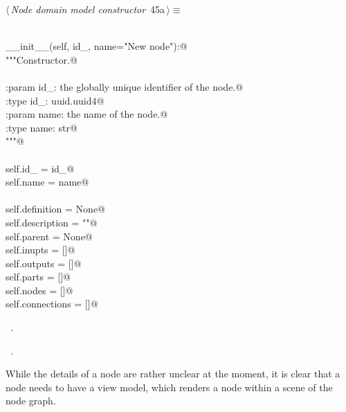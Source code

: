 \documentclass[
    a4paper,      %
    10pt,         %
    openright,    %
    notitlepage,  %
    parskip=half, %
]{scrreprt}       %
\theoremstyle{definition}                    %
\begin{document}
\begin{flushleft} \small
\begin{minipage}{\linewidth}\label{scrap58}\raggedright\small
{} $\langle\,${\itshape Node domain model constructor}\nobreak\ {\footnotesize {45a}}$\,\rangle\equiv$
\vspace{-1ex}
\begin{list}{}{} \item
\mbox{}\lstinline@@\\
\mbox{}\lstinline@def __init__(self, id_, name="New node"):@\\
\mbox{}\lstinline@    """Constructor.@\\
\mbox{}\lstinline@@\\
\mbox{}\lstinline@    :param id_: the globally unique identifier of the node.@\\
\mbox{}\lstinline@    :type  id_: uuid.uuid4@\\
\mbox{}\lstinline@    :param name: the name of the node.@\\
\mbox{}\lstinline@    :type  name: str@\\
\mbox{}\lstinline@    """@\\
\mbox{}\lstinline@@\\
\mbox{}\lstinline@    self.id_   = id_@\\
\mbox{}\lstinline@    self.name = name@\\
\mbox{}\lstinline@@\\
\mbox{}\lstinline@    self.definition = None@\\
\mbox{}\lstinline@    self.description = ""@\\
\mbox{}\lstinline@    self.parent = None@\\
\mbox{}\lstinline@    self.inupts = []@\\
\mbox{}\lstinline@    self.outputs = []@\\
\mbox{}\lstinline@    self.parts = []@\\
\mbox{}\lstinline@    self.nodes = []@\\
\mbox{}\lstinline@    self.connections = []@\\
\mbox{}\lstinline@@{\NWsep}
\end{list}
\vspace{-1.5ex}
\footnotesize
\begin{list}{}{\setlength{\itemsep}{-\parsep}\setlength{\itemindent}{-\leftmargin}}
\item \NWtxtMacroDefBy\ .
\item \NWtxtMacroRefIn\ .

\item{}
\end{list}
\end{minipage}\vspace{4ex}
\end{flushleft}
While the details of a node are rather unclear at the moment, it is clear that
a node needs to have a view model, which renders a node within a scene of the
node graph.
\end{document}
